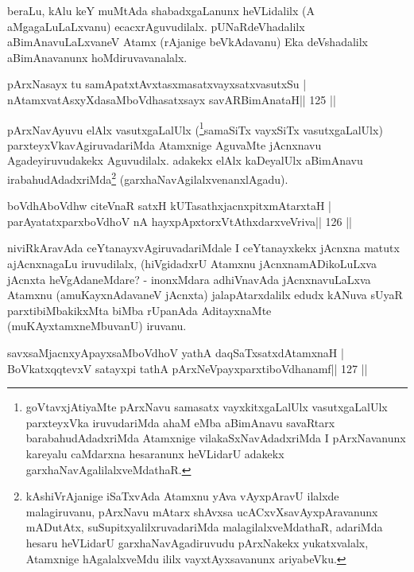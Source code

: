 \begin{artha}
beraLu, kAlu keY muMtAda shabadxgaLanunx heVLidalilx (A  aMgagaLuLaLxvanu) ecacxrAguvudilalx. pUNaRdeVhadalilx  aBimAnavuLaLxvaneV Atamx (rAjanige beVkAdavanu) Eka deVshadalilx aBimAnavanunx hoMdiruvavanalalx.
\end{artha}

\begin{shl}
pArxNasayx tu samApatxtAvxtasxmasatxvayxsatxvasutxSu |
nA\s\s tamxvatAsxyXdasaMboVdhasatxsayx savARBimAnataH\hfill || 125 ||
\end{shl}

\begin{artha}
pArxNavAyuvu elAlx vasutxgaLalUlx (\footnote{goVtavxjAtiyaMte  pArxNavu samasatx vayxkitxgaLalUlx vasutxgaLalUlx parxteyxVka iruvudariMda ahaM eMba aBimAnavu savaRtarx barabahudAdadxriMda Atamxnige vilakaSxNavAdadxriMda I pArxNavanunx kareyalu caMdarxna hesaranunx heVLidarU adakekx garxhaNavAgalilalxveMdathaR.}samaSiTx vayxSiTx vasutxgaLalUlx) parxteyxVkavAgiruvadariMda Atamxnige AguvaMte jAcnxnavu Agadeyiruvudakekx Aguvudilalx. adakekx elAlx kaDeyalUlx aBimAnavu irabahudAdadxriMda\footnote{kAshiVrAjanige iSaTxvAda Atamxnu yAva vAyxpAravU ilalxde malagiruvanu, pArxNavu mAtarx shAvxsa ucACxvXsavAyxpAravanunx mADutAtx, suSupitxyalilxruvadariMda malagilalxveMdathaR, adariMda hesaru heVLidarU garxhaNavAgadiruvudu pArxNakekx yukatxvalalx, Atamxnige hAgalalxveMdu ililx vayxtAyxsavanunx ariyabeVku.} (garxhaNavAgilalxvenanxlAgadu).
\end{artha}

\begin{shl}
boVdhAboVdhw citeVnaR satxH kUTasathxjacnxpitxmAtarxtaH |
parAyatatxparxboVdhoV nA hayxpApxtorxVtAthxdarxveVriva\hfill || 126 ||
\end{shl}

\begin{artha}
niviRkAravAda ceYtanayxvAgiruvadariMdale I ceYtanayxkekx jAcnxna matutx ajAcnxnagaLu iruvudilalx, (hiVgidadxrU Atamxnu jAcnxnamADikoLuLxva jAcnxta heVgAdaneMdare? - inonxMdara adhiVnavAda jAcnxnavuLaLxva Atamxnu (amuKayxnAdavaneV jAcnxta) jalapAtarxdalilx edudx kANuva sUyaR parxtibiMbakikxMta biMba rUpanAda AditayxnaMte (muKAyxtamxneMbuvanU) iruvanu.
\end{artha}

\begin{shl}
savxsaMjacnxyA\s payxsaMboVdhoV yathA daqSaTxsatxdAtamxnaH |
BoVkatxqqtevxV satayxpi tathA pArxNeV\s payxparxtiboVdhanamf\hfill || 127 ||
\end{shl}

